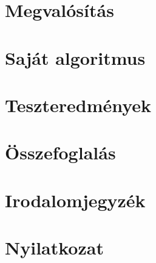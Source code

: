 \documentclass[12pt]{report} %
\begin{document}
\chapter{Megvalósítás} %

\chapter{Saját algoritmus} %

\chapter{Teszteredmények} %

\chapter{Összefoglalás} %

\chapter{Irodalomjegyzék} %

\chapter{Nyilatkozat} %
\end{document}

